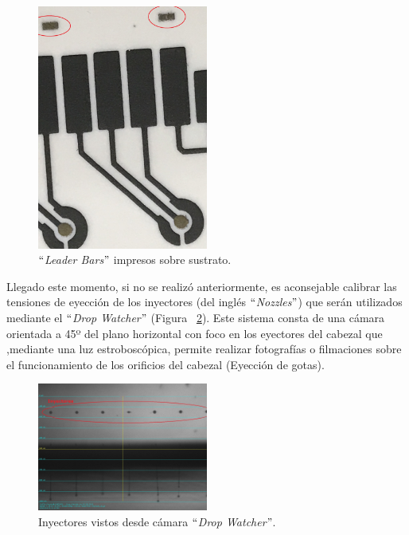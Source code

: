 \begin{figure}[H]
  \centering
    \includegraphics[width=0.5\textwidth]{Figuras/Figura_Leader_Bar}
  \caption{$``$\textit{Leader Bars}$"$ impresos sobre sustrato.}
  \label{fig:Figura_Leader_Bar}
\end{figure}

Llegado este momento, si no se realizó anteriormente, es aconsejable calibrar las tensiones de eyección de los inyectores (del inglés $``$\textit{Nozzles}$"$) que serán utilizados mediante el $``$\textit{Drop Watcher}$"$ (Figura ~\ref{fig:Figura_nozzles}). Este sistema consta de una cámara orientada a 45º del plano horizontal con foco en los eyectores del cabezal que ,mediante una luz estroboscópica, permite realizar fotografías o filmaciones sobre el funcionamiento de los orificios del cabezal (Eyección de gotas).

\begin{figure}[H]
  \centering
    \includegraphics[width=0.5\textwidth]{Figuras/Figura_nozzles}
  \caption{Inyectores vistos desde cámara $``$\textit{Drop Watcher}$"$.}
  \label{fig:Figura_nozzles}
\end{figure}

